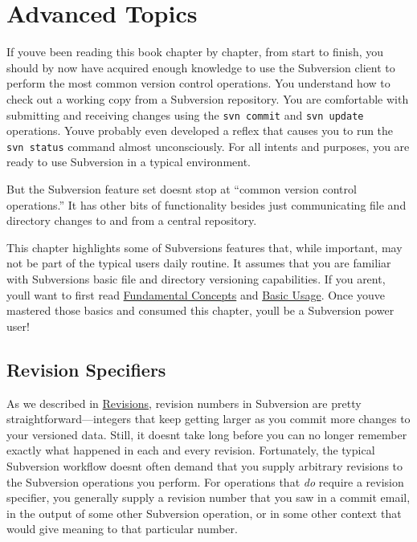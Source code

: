 \chapter{Advanced Topics}\label{svn.advanced}

If you\textquotesingle ve been reading this book chapter by chapter,
from start to finish, you should by now have acquired enough knowledge
to use the Subversion client to perform the most common version control
operations. You understand how to check out a working copy from a
Subversion repository. You are comfortable with submitting and receiving
changes using the \texttt{svn\ commit} and \texttt{svn\ update}
operations. You\textquotesingle ve probably even developed a reflex that
causes you to run the \texttt{svn\ status} command almost unconsciously.
For all intents and purposes, you are ready to use Subversion in a
typical environment.

But the Subversion feature set doesn\textquotesingle t stop at ``common
version control operations.'' It has other bits of functionality besides
just communicating file and directory changes to and from a central
repository.

This chapter highlights some of Subversion\textquotesingle s features
that, while important, may not be part of the typical
user\textquotesingle s daily routine. It assumes that you are familiar
with Subversion\textquotesingle s basic file and directory versioning
capabilities. If you aren\textquotesingle t, you\textquotesingle ll want
to first read \hyperref[svn.basic]{Fundamental Concepts} and
\hyperref[svn.tour]{Basic Usage}. Once you\textquotesingle ve mastered
those basics and consumed this chapter, you\textquotesingle ll be a
Subversion power user!

\section{Revision Specifiers}\label{svn.tour.revs.specifiers}

As we described in \hyperref[svn.basic.in-action.revs]{Revisions},
revision numbers in Subversion are pretty straightforward---integers
that keep getting larger as you commit more changes to your versioned
data. Still, it doesn\textquotesingle t take long before you can no
longer remember exactly what happened in each and every revision.
Fortunately, the typical Subversion workflow doesn\textquotesingle t
often demand that you supply arbitrary revisions to the Subversion
operations you perform. For operations that \emph{do} require a revision
specifier, you generally supply a revision number that you saw in a
commit email, in the output of some other Subversion operation, or in
some other context that would give meaning to that particular number.

